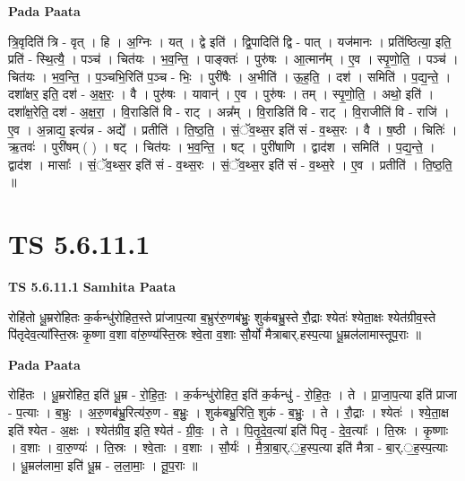 \documentclass[17pt]{extarticle}
\begin{document}
\textbf{Pada Paata} \newline

त्रि॒वृदिति॑ त्रि - वृत् । हि । अ॒ग्निः । यत् । द्वे इति॑ । द्वि॒पादिति॑ द्वि - पात् । यज॑मानः । प्रति॑ष्ठित्या॒ इति॒ प्रति॑ - स्थि॒त्यै॒ । पञ्च॑ । चित॑यः । भ॒व॒न्ति॒ । पाङ्क्तः॑ । पुरु॑षः । आ॒त्मान᳚म् । ए॒व । स्पृ॒णो॒ति॒ । पञ्च॑ । चित॑यः । भ॒व॒न्ति॒ । प॒ञ्चभि॒रिति॑ प॒ञ्च - भिः॒ । पुरी॑षैः । अ॒भीति॑ । ऊ॒ह॒ति॒ । दश॑ । समिति॑ । प॒द्य॒न्ते॒ । दशा᳚क्षर॒ इति॒ दश॑ - अ॒क्ष॒रः॒ । वै । पुरु॑षः । यावान्॑ । ए॒व । पुरु॑षः । तम् । स्पृ॒णो॒ति॒ । अथो॒ इति॑ । दशा᳚क्ष॒रेति॒ दश॑ - अ॒क्ष॒रा॒ । वि॒राडिति॑ वि - राट् । अन्न᳚म् । वि॒राडिति॑ वि - राट् । वि॒राजीति॑ वि - राजि॑ । ए॒व । अ॒न्नाद्य॒ इत्य॑न्न - अद्ये᳚ । प्रतीति॑ । ति॒ष्ठ॒ति॒ । सं॒ॅव॒थ्स॒र इति॑ सं - व॒थ्स॒रः । वै । ष॒ष्ठी । चितिः॑ । ऋ॒तवः॑ । पुरी॑षम् ( ) । षट् । चित॑यः । भ॒व॒न्ति॒ । षट् । पुरी॑षाणि । द्वाद॑श । समिति॑ । प॒द्य॒न्ते॒ । द्वाद॑श । मासाः᳚ । सं॒ॅव॒थ्स॒र इति॑ सं - व॒थ्स॒रः । सं॒ॅव॒थ्स॒र इति॑ सं - व॒थ्स॒रे । ए॒व । प्रतीति॑ । ति॒ष्ठ॒ति॒ ॥  \newline




\section*{ TS 5.6.11.1 }

\textbf{TS 5.6.11.1 } \newline
\textbf{Samhita Paata} \newline

रोहि॑तो धू॒म्ररो॑हितः क॒र्कन्धु॑रोहित॒स्ते प्रा॑जाप॒त्या ब॒भ्रुर॑रु॒णब॑भ्रुः॒ शुक॑बभ्रु॒स्ते रौ॒द्राः श्येतः॑ श्येता॒क्षः श्येत॑ग्रीव॒स्ते पि॑तृदेव॒त्या᳚स्ति॒स्रः कृ॒ष्णा व॒शा वा॑रु॒ण्य॑स्ति॒स्रः श्वे॒ता व॒शाः सौ॒र्यो॑ मैत्राबार्.हस्प॒त्या धू॒म्रल॑लामास्तूप॒राः ॥ \newline

\textbf{Pada Paata} \newline

रोहि॑तः । धू॒म्ररो॑हित॒ इति॑ धू॒म्र - रो॒हि॒तः॒ । क॒र्कन्धु॑रोहित॒ इति॑ क॒र्कन्धु॑ - रो॒हि॒तः॒ । ते । प्रा॒जा॒प॒त्या इति॑ प्राजा - प॒त्याः । ब॒भ्रुः । अ॒रु॒णब॑भ्रु॒रित्य॑रु॒ण - ब॒भ्रुः॒ । शुक॑बभ्रु॒रिति॒ शुक॑ - ब॒भ्रुः॒ । ते । रौ॒द्राः । श्येतः॑ । श्ये॒ता॒क्ष इति॑ श्येत - अ॒क्षः । श्येत॑ग्रीव॒ इति॒ श्येत॑ - ग्री॒वः॒ । ते । पि॒तृ॒दे॒व॒त्या॑ इति॑ पितृ - दे॒व॒त्याः᳚ । ति॒स्रः । कृ॒ष्णाः । व॒शाः । वा॒रु॒ण्यः॑ । ति॒स्रः । श्वे॒ताः । व॒शाः । सौ॒र्यः॑ । मै॒त्रा॒बा॒र्.॒ह॒स्प॒त्या इति॑ मैत्रा - बा॒र्.॒ह॒स्प॒त्याः । धू॒म्रल॑लामा॒ इति॑ धू॒म्र - ल॒ला॒माः॒ । तू॒प॒राः ॥  \newline
\end{document}
